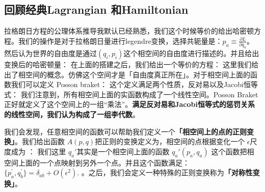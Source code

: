 \subsection{回顾经典Lagrangian
和Hamiltonian}
拉格朗日方程的公理体系推导我默认已经熟悉，我们这个时候等价的给出哈密顿方程。我们的操作是对于拉格朗日量进行legendre变换，选择共轭量是：$ p_a\equiv\frac{\partial L}{\partial\dot{q}_a} $。然后认为世界的自由度是通过$ (q_i,p_i) $这个相空间的自由度进行描述的。并且给出变换后的哈密顿量：
在上面的搭建之后，我们给出一个等价的方程：
这里我们给出了相空间的概念。仿佛这个空间才是「自由度真正所在」。对于相空间上面的函数我们可以定义 Posson braket：
这个定义满足两个性质，反对易以及Jacobi恒等式：
我们注意到，所有相空间上面的实函数构成了一个线性空间。Posson Braket正好就定义了这个空间上的一组“乘法”。\textbf{满足反对易和Jacobi恒等式的惩罚关系的线性空间，我们认为构成了一组李代数}。

我们会发现，任意相空间的函数可以帮助我们定义一个\textbf{「相空间上的点的正则变换」}。我们给出函数 $ A(p,q) $把正则的变换定义为，相空间的点根据变化一个 $ \epsilon $尺度成为 ：
我们这里 $ q_a' $其实是一个相空间上面的函数 $ q_a'(p_a,q_a) $ 这个函数把相空间上面的一个点映射到另外一个点。并且这个函数满足：$ \{p_a^{\prime},q_b^{\prime}\}=\delta_{ab}+O(\epsilon^2). $  。之后，我们会定义一种特殊的正则变换称为\textbf{「对称性变换」}。


